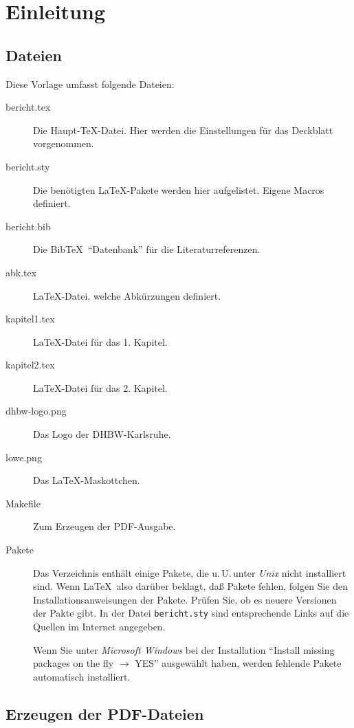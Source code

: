 
\chapter{Einleitung}

\section{Dateien}
Diese Vorlage umfasst folgende Dateien:
\begin{description}
\item[bericht.tex] Die Haupt-\TeX-Datei. Hier werden die Einstellungen für das
     Deckblatt vorgenommen.
\item[bericht.sty] Die benötigten \LaTeX-Pakete werden hier aufgelistet. Eigene Macros definiert.
\item[bericht.bib] Die Bib\TeX\ "`Datenbank"' für die Literaturreferenzen.
\item[abk.tex] \LaTeX-Datei, welche Abkürzungen definiert.
\item[kapitel1.tex] \LaTeX-Datei für das 1. Kapitel.
\item[kapitel2.tex] \LaTeX-Datei für das 2. Kapitel.
\item[dhbw-logo.png] Das Logo der DHBW-Karlsruhe.
\item[lowe.png] Das \LaTeX-Maskottchen.
\item[Makefile] Zum Erzeugen der PDF-Ausgabe.
\item[Pakete] Das Verzeichnis enthält einige Pakete, die u.\,U.\,unter \emph{Unix} nicht installiert
     sind. Wenn \LaTeX\ also darüber beklagt, daß Pakete fehlen, folgen Sie den Installationsanweisungen
     der Pakete. Prüfen Sie, ob es neuere Versionen der Pakte gibt. In der Datei
     \texttt{bericht.sty} sind entsprechende Links auf die Quellen im Internet angegeben.

     Wenn Sie unter \emph{Microsoft Windows} bei der Installation
     \enquote{Install missing packages on the fly $\longrightarrow$ YES} ausgewählt haben,
     werden fehlende Pakete automatisch installiert.
\end{description}


\section{Erzeugen der PDF-Dateien}

